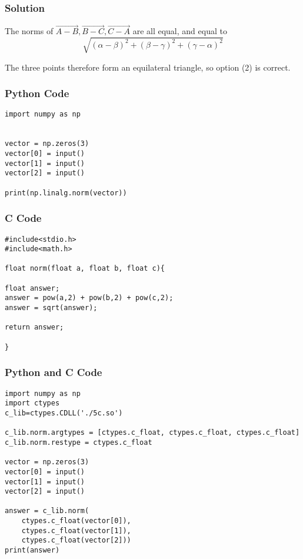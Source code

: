 \documentclass{beamer}
\begin{document}
\begin{frame}[fragile]
    \frametitle{Solution}

The norms of $\vec{A-B}, \vec{B-C}, \vec{C-A}$ are all equal, and equal to 
$$\sqrt{(\alpha - \beta)^2  + (\beta - \gamma)^2 + (\gamma - \alpha)^2}$$

The three points therefore form an equilateral triangle, so option (2) is correct.

\end{frame}


\begin{frame}[fragile]
    \frametitle{Python Code}
    \begin{lstlisting}
import numpy as np


vector = np.zeros(3)
vector[0] = input()
vector[1] = input()
vector[2] = input()

print(np.linalg.norm(vector))

\end{lstlisting}

\end{frame}


\begin{frame}[fragile]
\frametitle{C Code}
\begin{lstlisting}
#include<stdio.h>
#include<math.h>

float norm(float a, float b, float c){

float answer;
answer = pow(a,2) + pow(b,2) + pow(c,2);
answer = sqrt(answer);

return answer;

}
\end{lstlisting}

\end{frame}


\begin{frame}[fragile]
\frametitle{Python and C Code}
\begin{lstlisting}
import numpy as np
import ctypes
c_lib=ctypes.CDLL('./5c.so')

c_lib.norm.argtypes = [ctypes.c_float, ctypes.c_float, ctypes.c_float]
c_lib.norm.restype = ctypes.c_float

vector = np.zeros(3)
vector[0] = input()
vector[1] = input()
vector[2] = input()

answer = c_lib.norm(
    ctypes.c_float(vector[0]),
    ctypes.c_float(vector[1]), 
    ctypes.c_float(vector[2]))
print(answer)
\end{lstlisting}

\end{frame}
\end{document}
